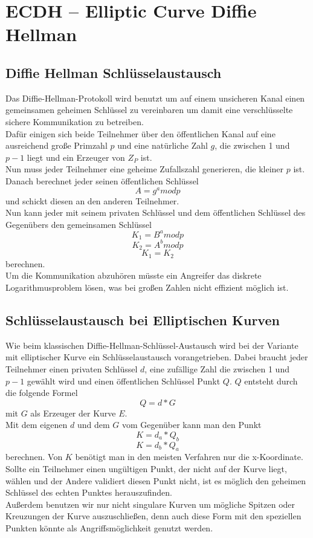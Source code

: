 \chapter{ECDH – Elliptic Curve Diffie Hellman}
\section{Diffie Hellman Schlüsselaustausch}
Das Diffie-Hellman-Protokoll wird benutzt um auf einem unsicheren Kanal einen gemeinsamen geheimen Schlüssel zu vereinbaren um damit eine verschlüsselte sichere Kommunikation zu betreiben.\\
Dafür einigen sich beide Teilnehmer über den öffentlichen Kanal auf eine ausreichend große Primzahl \(p\) und eine natürliche Zahl \(g\), die zwischen 1 und \(p-1\) liegt und ein Erzeuger von \(Z_P\) ist.\\
Nun muss jeder Teilnehmer eine geheime Zufallszahl generieren, die kleiner \(p\) ist. Danach berechnet jeder seinen öffentlichen Schlüssel \[A = g^a mod p\] und schickt diesen an den anderen Teilnehmer.\\
Nun kann jeder mit seinem privaten Schlüssel und dem öffentlichen Schlüssel des Gegenübers den gemeinsamen Schlüssel \[K_1 = B^a mod p\] \[K_2 = A^b mod p\] \[K_1 = K_2\] berechnen.\\
Um die Kommunikation abzuhören müsste ein Angreifer das diskrete Logarithmusproblem lösen, was bei großen Zahlen nicht effizient möglich ist.

\section{Schlüsselaustausch bei Elliptischen Kurven}
Wie beim klassischen Diffie-Hellman-Schlüssel-Austausch wird bei der Variante mit elliptischer Kurve ein Schlüsselaustausch vorangetrieben. Dabei braucht jeder Teilnehmer einen privaten Schlüssel \(d\), eine zufällige Zahl die zwischen 1 und \(p-1\) gewählt wird und einen öffentlichen Schlüssel Punkt \(Q\). \(Q\) entsteht durch die folgende Formel \[ Q = d * G\] mit \(G\) als Erzeuger der Kurve \(E\).\\ 
Mit dem eigenen \(d\) und dem \(G\) vom Gegenüber kann man den Punkt \[K = d_a * Q_b\] \[K = d_b * Q_a\] berechnen. Von \(K\) benötigt man in den meisten Verfahren nur die x-Koordinate.\\
Sollte ein Teilnehmer einen ungültigen Punkt, der nicht auf der Kurve liegt, wählen und der Andere validiert diesen Punkt nicht, ist es möglich den geheimen Schlüssel des echten Punktes herauszufinden. \\Außerdem benutzen wir nur nicht singulare Kurven um mögliche Spitzen oder Kreuzungen der Kurve auszuschließen, denn auch diese Form mit den speziellen Punkten könnte als Angriffsmöglichkeit genutzt werden.

